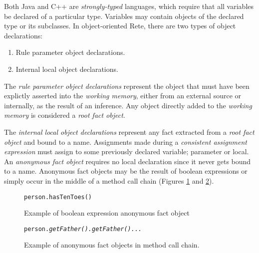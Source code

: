 \documentclass[10pt,twocolumn,letterpaper,colorhighlight]{article}
\newenvironment{codelisting}%
	{\begin{minipage}{250pt}\small\begin{alltt}}%
	{\end{alltt}\end{minipage}}
\begin{document}
Both Java and C++ are \emph{strongly-typed} languages, which require
that all variables be declared of a particular type. Variables may
contain objects of the declared type or its subclasses. In
object-oriented Rete, there are two types of object declarations: 

	\begin{enumerate}
		\item Rule parameter object declarations.
		\item Internal local object declarations.
	\end{enumerate}

The \emph{rule parameter object declarations} represent the object that
must have been explictly asserted into the \emph{working memory}, either
from an external source or internally, as the result of an inference.
Any object directly added to the \emph{working memory} is considered a
\emph{root fact object}.

The \emph{internal local object declarations} represent any fact
extracted from a \emph{root fact object} and bound to a name.
Assignments made during a \emph{consistent assignment expression} must
assign to some previously declared variable; parameter or local. An
\emph{anonymous fact object} requires no local declaration since it 
never gets bound to a name.  Anonymous fact objects may be the result of
boolean expressions or simply occur in the middle of a method call
chain (Figures \ref{example.anonymous-fact-objects.boolean} and
\ref{example.anonymous-fact-objects.chain}).

	\begin{figure}
	\begin{codelisting}
	person.hasTenToes()
	\end{codelisting}

	\caption{Example of boolean expression anonymous fact object}
	\label{example.anonymous-fact-objects.boolean}
	\end{figure}


	\begin{figure}
	\begin{codelisting}
	person.\emph{getFather().getFather()...}
	\end{codelisting}

	\caption{Example of anonymous fact objects in method call chain.}
	\label{example.anonymous-fact-objects.chain}
	\end{figure}
\end{document}
